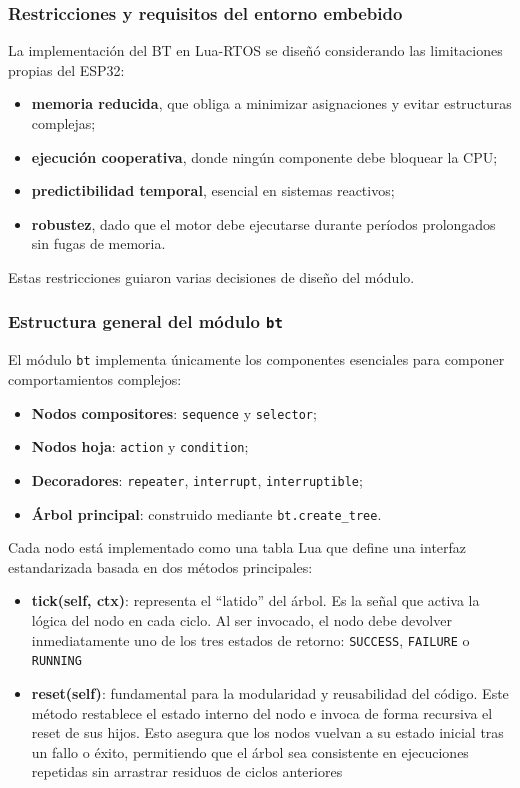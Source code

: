 \documentclass{prgrado}
\begin{document}
\subsubsection{Restricciones y requisitos del entorno embebido}

La implementación del BT en Lua-RTOS se diseñó considerando las limitaciones propias del ESP32:

\begin{itemize}
    \item \textbf{memoria reducida}, que obliga a minimizar asignaciones y evitar estructuras complejas;
    \item \textbf{ejecución cooperativa}, donde ningún componente debe bloquear la CPU;
    \item \textbf{predictibilidad temporal}, esencial en sistemas reactivos;
    \item \textbf{robustez}, dado que el motor debe ejecutarse durante períodos prolongados sin fugas de memoria.
\end{itemize}

Estas restricciones guiaron varias decisiones de diseño del módulo.

\subsubsection{Estructura general del módulo \texttt{bt}}

El módulo \texttt{bt} implementa únicamente los componentes esenciales para componer comportamientos complejos:

\begin{itemize}
    \item \textbf{Nodos compositores}: \texttt{sequence} y \texttt{selector};
    \item \textbf{Nodos hoja}: \texttt{action} y \texttt{condition};
    \item \textbf{Decoradores}: \texttt{repeater}, \texttt{interrupt}, \texttt{interruptible};
    \item \textbf{Árbol principal}: construido mediante \texttt{bt.create\_tree}.
\end{itemize}

Cada nodo está implementado como una tabla Lua que define una interfaz estandarizada basada en dos métodos principales:

\begin{itemize}
    \item \textbf{tick(self, ctx)}: representa el ``latido'' del árbol. Es la señal que activa la lógica del nodo en cada ciclo. Al ser invocado, el nodo debe devolver inmediatamente uno de los tres estados de retorno: \texttt{SUCCESS}, \texttt{FAILURE} o \texttt{RUNNING}
    \item \textbf{reset(self)}: fundamental para la modularidad y reusabilidad del código. Este método restablece el estado interno del nodo e invoca de forma recursiva el reset de sus hijos. Esto asegura que los nodos vuelvan a su estado inicial tras un fallo o éxito, permitiendo que el árbol sea consistente en ejecuciones repetidas sin arrastrar residuos de ciclos anteriores
\end{itemize}
\end{document}
